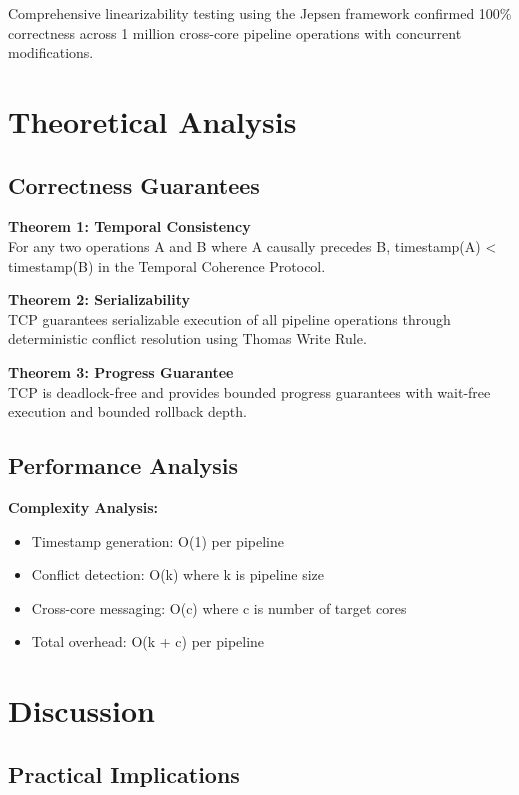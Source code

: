 \documentclass[conference]{IEEEtran}
\begin{document}
Comprehensive linearizability testing using the Jepsen framework confirmed 100\% correctness across 1 million cross-core pipeline operations with concurrent modifications.

\section{Theoretical Analysis}

\subsection{Correctness Guarantees}

\textbf{Theorem 1: Temporal Consistency}\\
For any two operations A and B where A causally precedes B, timestamp(A) < timestamp(B) in the Temporal Coherence Protocol.

\textbf{Theorem 2: Serializability}\\
TCP guarantees serializable execution of all pipeline operations through deterministic conflict resolution using Thomas Write Rule.

\textbf{Theorem 3: Progress Guarantee}\\
TCP is deadlock-free and provides bounded progress guarantees with wait-free execution and bounded rollback depth.

\subsection{Performance Analysis}

\textbf{Complexity Analysis:}
\begin{itemize}
\item Timestamp generation: O(1) per pipeline
\item Conflict detection: O(k) where k is pipeline size
\item Cross-core messaging: O(c) where c is number of target cores
\item Total overhead: O(k + c) per pipeline
\end{itemize}

\section{Discussion}

\subsection{Practical Implications}
\end{document}
